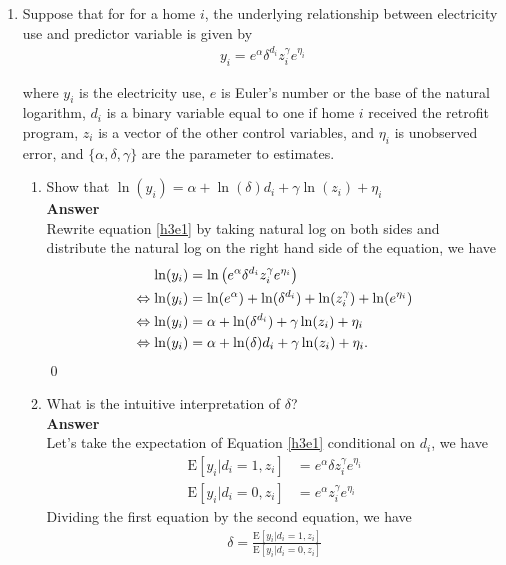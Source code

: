 \documentclass{article}
\newcommand{\E}{\text{E}}
\begin{document}
\begin{enumerate}
\item Suppose that for for a home $i$, the underlying relationship between electricity use and predictor variable is given by 
\begin{align}
    y_i=e^\alpha\delta^{d_i}z_i^{\gamma}e^{\eta_i} \label{h3e1}
\end{align}

where $y_i$ is the electricity use, $e$ is Euler's number or the base of the natural logarithm, $d_i$ is a binary variable equal to one if home $i$ received the retrofit program, $z_i$ is a vector of the other control variables, and $\eta_i$ is unobserved error, and $\{\alpha,\delta,\gamma\}$ are the parameter to estimates.


\begin{enumerate}
    \item Show that $\ln(y_i)=\alpha+\ln(\delta)d_i+\gamma\ln(z_i)+\eta_i$
    \\\textbf{Answer}\\
    Rewrite equation \eqref{h3e1} by taking natural log on both sides and distribute the natural log on the right hand side of the equation, we have
    \begin{align}
         \ln(y_i)&=\ln\left(e^\alpha\delta^{d_i}z_i^{\gamma}e^{\eta_i}\right) \notag\\
        \Leftrightarrow\ln(y_i)&=\ln(e^\alpha)+\ln(\delta^{d_i})+\ln(z_i^{\gamma})+\ln(e^{\eta_i}) \notag\\
        \Leftrightarrow\ln(y_i)&=\alpha+\ln(\delta^{d_i})+\gamma\ln(z_i)+\eta_i \notag\\
        \Leftrightarrow\ln(y_i)&=\alpha+\ln(\delta)d_i+\gamma\ln(z_i)+\eta_i\label{h3e2}.
    \end{align}\qed
    \item What is the intuitive interpretation of $\delta$?
    \\\textbf{Answer}\\
    Let's take the expectation of Equation \eqref{h3e1} conditional on $d_i$, we have
    \begin{align}
        \E[y_i|d_i=1,z_i]&=e^\alpha\delta z_i^{\gamma}e^{\eta_i}\\
        \E[y_i|d_i=0,z_i]&=e^\alpha z_i^{\gamma}e^{\eta_i}
    \end{align}
    Dividing the first equation by the second equation, we have
    \begin{align}
        \delta=\frac{\E[y_i|d_i=1,z_i]}{\E[y_i|d_i=0,z_i]} \label{h3e5} 

\end{align}
\end{enumerate}
\end{enumerate}
\end{document}
